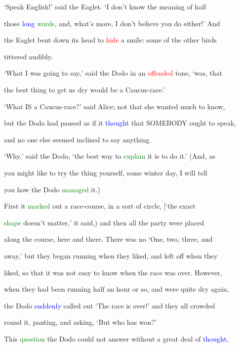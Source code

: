  ‘Speak English!’ said the Eaglet. ‘I don’t know the meaning of half

 those \textcolor{blue}{long} \textcolor{green}{words,} and, what’s more, I don’t believe you do either!’ And

 the Eaglet bent down its head to \textcolor{red}{hide} a \textcolor{BurntOrange}{smile:} some of the other birds

 tittered audibly.



 ‘What I was going to say,’ said the Dodo in an \textcolor{red}{offended} tone, ‘was, that

 the best thing to get us dry would be a Caucus-race.’



 ‘What IS a Caucus-race?’ said Alice; not that she wanted much to know,

 but the Dodo had paused as if it \textcolor{blue}{thought} that SOMEBODY ought to speak,

 and no one else seemed inclined to say anything.



 ‘Why,’ said the Dodo, ‘the best way to \textcolor{green}{explain} it is to do it.’ (And, as

 you might like to try the thing yourself, some winter day, I will tell

 you how the Dodo \textcolor{green}{managed} it.)



 First it \textcolor{green}{marked} out a race-course, in a sort of circle, [‘the exact

 \textcolor{green}{shape} doesn’t matter,’ it said,) and then all the party were placed

 along the course, here and there. There was no ‘One, two, three, and

 away,’ but they began running when they liked, and left off when they

 liked, so that it was not easy to know when the race was over. However,

 when they had been running half an hour or so, and were quite dry again,

 the Dodo \textcolor{blue}{suddenly} called out ‘The race is over!’ and they all crowded

 round it, panting, and asking, ‘But who has won?’



 This \textcolor{green}{question} the Dodo could not answer without a great \textcolor{BurntOrange}{deal} of \textcolor{blue}{thought,}

